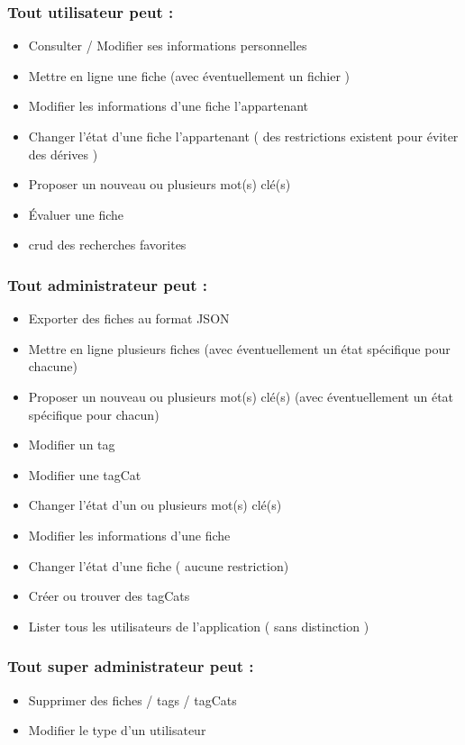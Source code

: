 \subsubsection*{Tout utilisateur peut : }
\begin{itemize}
    \item Consulter / Modifier ses informations personnelles
    \item Mettre en ligne une \gls{fiche}  (avec éventuellement un fichier )
    \item Modifier les informations d'une \gls{fiche}  l'appartenant
    \item Changer l'état d'une \gls{fiche}  l'appartenant ( des restrictions existent pour éviter des dérives )
    \item Proposer un nouveau ou plusieurs mot(s) clé(s)
    \item Évaluer une \gls{fiche}  
    \item \Gls{crud} des recherches favorites
\end{itemize}

\subsubsection*{Tout administrateur peut : }
\begin{itemize}
    \item Exporter des \glspl{fiche} au format JSON
    \item Mettre en ligne plusieurs \glspl{fiche} (avec éventuellement un état spécifique pour chacune)
    \item Proposer un nouveau ou plusieurs mot(s) clé(s) (avec éventuellement un état spécifique pour chacun)
    \item Modifier un \gls{tag} 
    \item Modifier une \gls{tagCat} 
    \item Changer l'état d'un ou plusieurs mot(s) clé(s)
    \item Modifier les informations d'une \gls{fiche} 
    \item Changer l'état d'une \gls{fiche} ( aucune restriction)
    \item Créer ou trouver des \glspl{tagCat}
    \item Lister tous les utilisateurs de l'application ( sans distinction )
\end{itemize}

\subsubsection*{Tout super administrateur peut : }
\begin{itemize}
    \item Supprimer des \glspl{fiche} / \glspl{tag} / \glspl{tagCat}
    \item Modifier le type d'un utilisateur
\end{itemize}
\pagebreak

